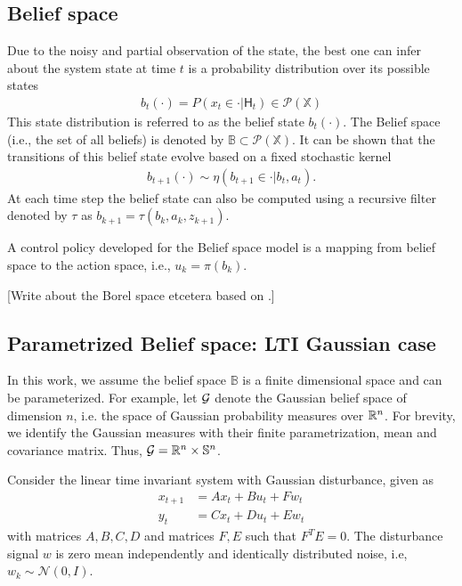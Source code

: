 \documentclass{ifacconf}
\newcommand{\red}[1]{{\color{red} #1}}
\newcommand{\X}{{\mathbb{X}}}
\newcommand{\Hist}{{\mathsf{H}}}
\renewcommand{\P}{P}
\renewcommand{\S}{\mathbb S}
\begin{document}
 \subsection{Belief space}
Due to the noisy and partial observation of the state, the best one can infer about the system state at time  $t$ is a probability distribution over its possible states
\begin{align}
	b_t(\cdot)=\P(x_t\in \cdot|\Hist_t )\in \mathcal P (\X)
\end{align}
This state distribution is referred to as the belief state $b_t(\cdot)$. 
The Belief space (i.e., the set of all beliefs) is denoted by $\mathbb{B}\subset \mathcal P(\X)$.
It can be shown that the transitions of this belief state evolve based on a fixed stochastic kernel
\begin{align}
	 b_{t+1}(\cdot)\sim \eta(b_{t+1}\in \cdot|b_t,a_t).
\end{align}
At each time step the belief state can also be computed using a 
recursive filter denoted by $\tau$ as $b_{k+1}=\tau(b_k,a_k,z_{k+1})$. 



A control policy developed for the Belief space model is a mapping from belief space to the action space, i.e., $u_k=\pi(b_k)$. 

\red{[Write about the Borel space etcetera based on \cite{bertsekas2004stochastic}.]}



\subsection{Parametrized Belief space: LTI Gaussian case}



    In this work, we assume the belief space $\mathbb{B}$ is  a finite dimensional space and can be parameterized. For example, let $\mathcal{G}$ denote the Gaussian belief space
    of dimension $n$, i.e. the space of Gaussian
    probability measures over $\mathbb{R}^n$.
    For brevity, we identify the Gaussian measures
    with their finite parametrization, mean and
    covariance matrix.
     Thus,
    $\CA{G} =  \BB{R}^n \times  \S^n$.
    
    
    
Consider the linear time invariant system with Gaussian disturbance, given as
\begin{align}
	x_{t+1} &= A x_{t}+Bu_{t}+ F w_{t}\\
	y_{t}&=C x_{t}+D u_{t}+E w_{t}
\end{align}
with matrices $A,B,C,D$ and matrices $F,E$ such that $F^TE=0$. 
The disturbance signal $w$ is zero mean independently and identically   distributed noise, i.e, $w_k\sim \mathcal{N}(0,I)$.
\end{document}
